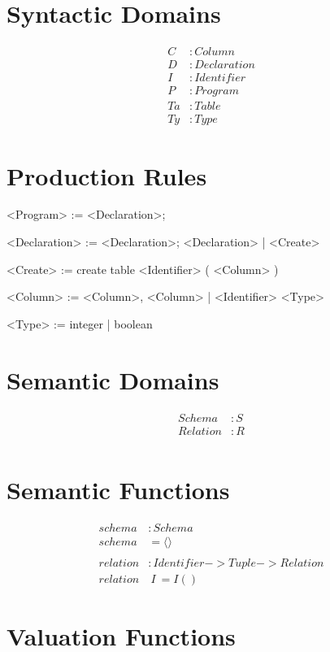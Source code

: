 \documentclass[12pt]{article}
\begin{document}
\section{Syntactic Domains}
\begin{align*}
  C &: Column \\
  D &: Declaration \\
  I &: Identifier \\
  P &: Program \\
  Ta &: Table \\
  Ty &: Type
\end{align*}

\section{Production Rules}
\begin{grammar}
  <Program> := <Declaration>;

  <Declaration> := <Declaration>; <Declaration> | <Create>

  <Create> := create table <Identifier> ( <Column> )

  <Column> := <Column>, <Column> | <Identifier> <Type>

  <Type> := integer | boolean
\end{grammar}

\section{Semantic Domains}
\begin{align*}
  Schema &: S \\
  Relation &: R \\
\end{align*}

\section{Semantic Functions}
\begin{align*}
  schema &: Schema \\
  schema &= \langle \rangle \\
   \\
  relation &: Identifier -> Tuple -> Relation \\
  relation&\ I\ = I()
\end{align*}

\section{Valuation Functions}
\end{document}
